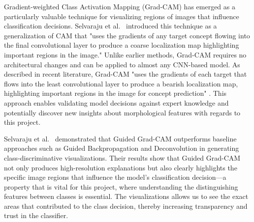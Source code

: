 \documentclass[a4paper,12pt]{report}
\begin{document}
Gradient-weighted Class Activation Mapping (Grad-CAM) has emerged as a particularly valuable technique for visualizing regions of images that influence classification decisions. Selvaraju et al.\ \citep{Selvaraju_2019} introduced this technique as a generalization of CAM that "uses the gradients of any target concept flowing into the final convolutional layer to produce a coarse localization map highlighting important regions in the image." Unlike earlier methods, Grad-CAM requires no architectural changes and can be applied to almost any CNN-based model. As described in recent literature, Grad-CAM "uses the gradients of each target that flows into the least convolutional layer to produce a bearish localization map, highlighting important regions in the image for concept prediction" \citep{Hasibuan2023Large}. This approach enables validating model decisions against expert knowledge and potentially discover new insights about morphological features with regards to this project.

Selvaraju et al.\ \citep{Selvaraju_2019} demonstrated that Guided Grad-CAM outperforms baseline approaches such as Guided Backpropagation and Deconvolution in generating class-discriminative visualizations. Their results show that Guided Grad-CAM not only produces high-resolution explanations but also clearly highlights the specific image regions that influence the model's classification decision---a property that is vital for this project, where understanding the distinguishing features between classes is essential. The visualizations allows us to see the exact areas that contributed to the class decision, thereby increasing transparency and trust in the classifier.


\end{document}
